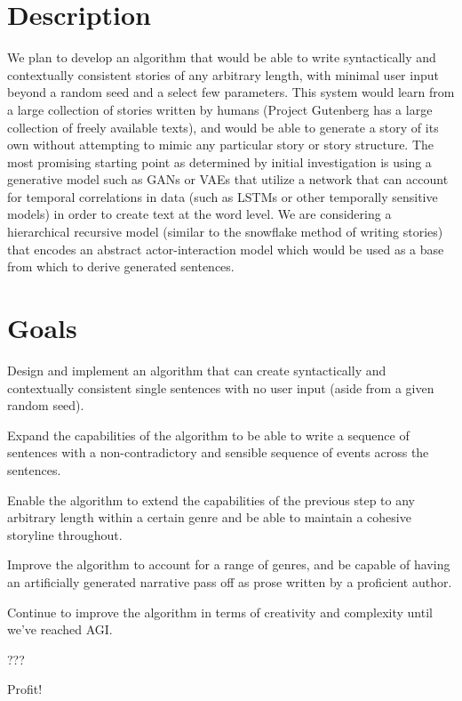 \documentclass[letter]{article}
\newcommand\tab[1][1cm]{\hspace*{#1}}
\newenvironment{menumerate}{%
  \edef\backupindent{\the\parindent}%
  \enumerate%
  \setlength{\parindent}{\backupindent}%
}{\endenumerate}
\begin{document}
\section{Description}
\tab We plan to develop an algorithm that would be able to write syntactically and contextually consistent stories of any arbitrary length, with minimal user input beyond a random seed and a select few parameters. This system would learn from a large collection of stories written by humans (Project Gutenberg has a large collection of freely available texts), and would be able to generate a story of its own without attempting to mimic any particular story or story structure. The most promising starting point as determined by initial investigation is using a generative model such as GANs or VAEs that utilize a network that can account for temporal correlations in data (such as LSTMs or other temporally sensitive models) in order to create text at the word level. We are considering a hierarchical recursive model (similar to the snowflake method of writing stories) that encodes an abstract actor-interaction model which would be used as a base from which to derive generated sentences.
\section{Goals}
\begin{menumerate}
    \item Design and implement an algorithm that can create syntactically and contextually consistent single sentences with no user input (aside from a given random seed).
    \item Expand the capabilities of the algorithm to be able to write a sequence of sentences with a non-contradictory and sensible sequence of events across the sentences.
     \item Enable the algorithm to extend the capabilities of the previous step to any arbitrary length within a certain genre and be able to maintain a cohesive storyline throughout.
     \item Improve the algorithm to account for a range of genres, and be capable of having an artificially generated narrative pass off as prose written by a proficient author.
     \item Continue to improve the algorithm in terms of creativity and complexity until we've reached AGI.
     \item ???
     \item Profit!
\end{menumerate}
\end{document}
